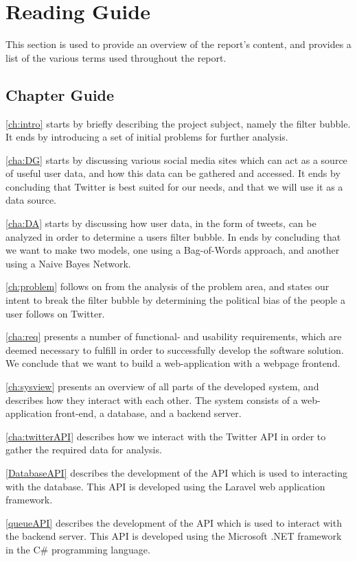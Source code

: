 \section{Reading Guide}\label{sec:readingGuide}
This section is used to provide an overview of the report's content, and
provides a list of the various terms used throughout the report. 

\subsection{Chapter Guide}
\autoref{ch:intro} starts by briefly describing the project subject, namely  the
filter bubble. It ends by introducing a set of initial problems for further
analysis.\nl

\autoref{cha:DG} starts by discussing various social media sites which can act
as a source of useful user data, and how this data can be gathered and accessed.
It ends by concluding that Twitter is best suited for our needs, and that we
will use it as a data source.\nl

\autoref{cha:DA} starts by discussing how user data, in the form of tweets, can
be analyzed in order to determine a users filter bubble. In ends by concluding
that we want to make two models, one using a Bag-of-Words approach, and another
using a Naive Bayes Network.\nl

\autoref{ch:problem} follows on from the analysis of the problem area, and
states our intent to break the filter bubble by determining the political bias
of the people a user follows on Twitter.\nl

\autoref{cha:req} presents a number of functional- and usability requirements,
which are deemed necessary to fulfill in order to successfully develop the
software solution. We conclude that we want to build a web-application with a
webpage frontend.\nl

\autoref{ch:sysview} presents an overview of all parts of the developed system,
and describes how they interact with each other. The system consists of a
web-application front-end, a database, and a backend server.\nl

\autoref{cha:twitterAPI} describes how we interact with the Twitter API in order
to gather the required data for analysis.\nl

\autoref{DatabaseAPI} describes the development of the API which is used to
interacting with the database. This API is developed using the Laravel web
application framework.\nl

\autoref{queueAPI} describes the development of the API which is used to
interact with the backend server. This API is developed using the Microsoft
.NET framework in the C\# programming language.\nl

